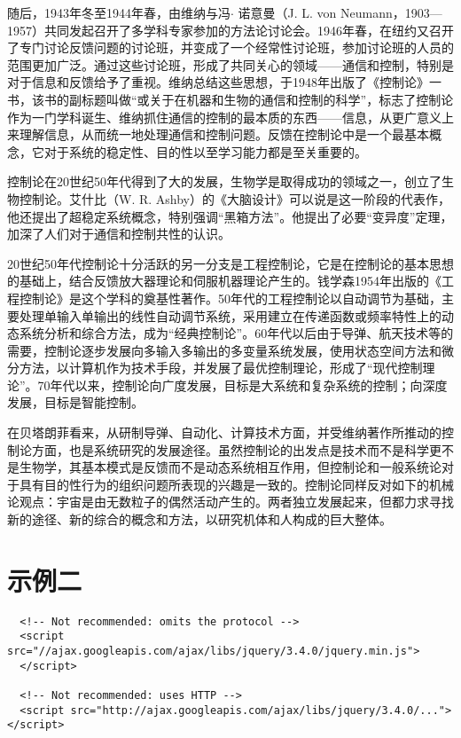 \documentclass[oneside, UTF8, fontset = adobe]{ctexart}
\begin{document}
\begin{tcolorbox}[enhanced, colback=GhostWhite, colframe=LightGray, coltitle=black, title=测试列表, fonttitle=\bfseries\Large, bottomrule=3ex, breakable=true]
  随后，1943年冬至1944年春，由维纳与冯$\cdot$ 诺意曼（J. L. von Neumann，1903—1957）共同发起召开了多学科专家参加的方法论讨论会。1946年春，在纽约又召开了专门讨论反馈问题的讨论班，并变成了一个经常性讨论班，参加讨论班的人员的范围更加广泛。通过这些讨论班，形成了共同关心的领域——通信和控制，特别是对于信息和反馈给予了重视。维纳总结这些思想，于1948年出版了《控制论》一书，该书的副标题叫做“或关于在机器和生物的通信和控制的科学”，标志了控制论作为一门学科诞生、维纳抓住通信的控制的最本质的东西——信息，从更广意义上来理解信息，从而统一地处理通信和控制问题。反馈在控制论中是一个最基本概念，它对于系统的稳定性、目的性以至学习能力都是至关重要的。
  
  控制论在20世纪50年代得到了大的发展，生物学是取得成功的领域之一，创立了生物控制论。艾什比（W. R. Ashby）的《大脑设计》可以说是这一阶段的代表作，他还提出了超稳定系统概念，特别强调“黑箱方法”。他提出了必要“变异度”定理，加深了人们对于通信和控制共性的认识。
  
  20世纪50年代控制论十分活跃的另一分支是工程控制论，它是在控制论的基本思想的基础上，结合反馈放大器理论和伺服机器理论产生的。钱学森1954年出版的《工程控制论》是这个学科的奠基性著作。50年代的工程控制论以自动调节为基础，主要处理单输入单输出的线性自动调节系统，采用建立在传递函数或频率特性上的动态系统分析和综合方法，成为“经典控制论”。60年代以后由于导弹、航天技术等的需要，控制论逐步发展向多输入多输出的多变量系统发展，使用状态空间方法和微分方法，以计算机作为技术手段，并发展了最优控制理论，形成了“现代控制理论”。70年代以来，控制论向广度发展，目标是大系统和复杂系统的控制；向深度发展，目标是智能控制。
  
  在贝塔朗菲看来，从研制导弹、自动化、计算技术方面，并受维纳著作所推动的控制论方面，也是系统研究的发展途径。虽然控制论的出发点是技术而不是科学更不是生物学，其基本模式是反馈而不是动态系统相互作用，但控制论和一般系统论对于具有目的性行为的组织问题所表现的兴趣是一致的。控制论同样反对如下的机械论观点：宇宙是由无数粒子的偶然活动产生的。两者独立发展起来，但都力求寻找新的途径、新的综合的概念和方法，以研究机体和人构成的巨大整体。
\end{tcolorbox}


\section{示例二}
\begin{tcolorbox}[
  colback=MistyRose,
  coltext=red,
  colframe=LightGray,
  boxrule=0.5mm
  ]
  \begin{verbatim}
  <!-- Not recommended: omits the protocol -->
  <script src="//ajax.googleapis.com/ajax/libs/jquery/3.4.0/jquery.min.js">
  </script>

  <!-- Not recommended: uses HTTP -->
  <script src="http://ajax.googleapis.com/ajax/libs/jquery/3.4.0/..."></script>\end{verbatim}
\end{tcolorbox}
\end{document}
